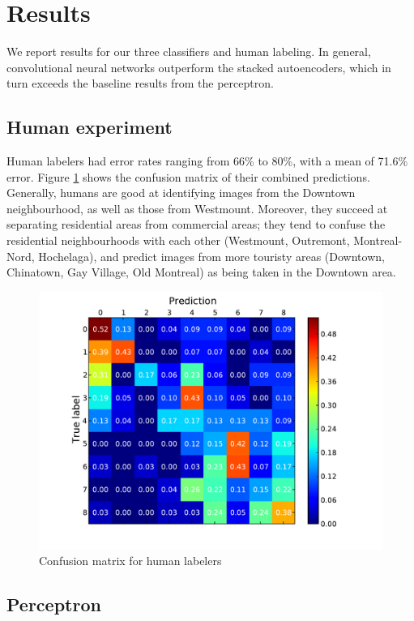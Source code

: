 \documentclass{acm_proc_article-sp}
\begin{document}
\section{Results}
We report results for our three classifiers and human labeling. In general, convolutional neural networks outperform the stacked autoencoders, which in turn exceeds the baseline results from the perceptron.

\subsection{Human experiment}

Human labelers had error rates ranging from 66\% to 80\%, with a mean of 71.6\% error. Figure \ref{fig:human-conf} shows the confusion matrix of their combined predictions. Generally, humans are good at identifying images from the Downtown neighbourhood, as well as those from Westmount. Moreover, they succeed at separating residential areas from commercial areas; they tend to confuse the residential neighbourhoods with each other (Westmount, Outremont, Montreal-Nord, Hochelaga), and predict images from more touristy areas (Downtown, Chinatown, Gay Village, Old Montreal) as being taken in the Downtown area.

\begin{figure}[h!]
\includegraphics[width=\linewidth]{human_confusion.pdf}
		\caption{Confusion matrix for human labelers}
		\label{fig:human-conf}
\end{figure}

\subsection{Perceptron}
\end{document}
